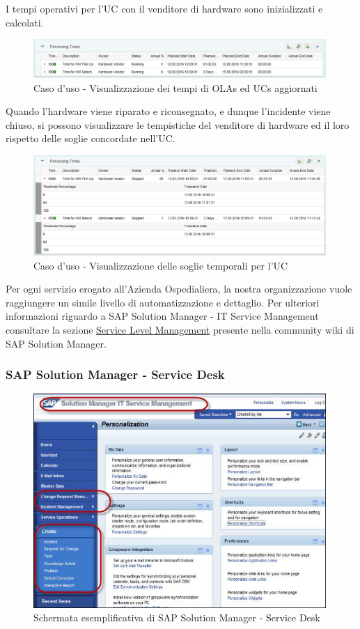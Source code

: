 I tempi operativi per l'UC con il venditore di hardware sono inizializzati e calcolati.

\begin{figure}[H]
\centering
\includegraphics[width=30em]{immagini/sla/sm4.png}
\caption{Caso d'uso - Visualizzazione dei tempi di OLAs ed UCs aggiornati}
\end{figure}

Quando l'hardware viene riparato e riconsegnato, e dunque l'incidente viene chiuso, si possono visualizzare le tempistiche del venditore di hardware ed il loro rispetto delle soglie concordate nell'UC.

\begin{figure}[H]
\centering
\includegraphics[width=30em]{immagini/sla/sm5.png}
\caption{Caso d'uso - Visualizzazione delle soglie temporali per l'UC}
\end{figure}

Per ogni servizio erogato all'Azienda Ospedialiera, la nostra organizzazione vuole raggiungere un simile livello di automatizzazione e dettaglio. Per ulteriori informazioni riguardo a SAP Solution Manager - IT Service Management consultare la sezione \href{https://wiki.scn.sap.com/wiki/display/SAPITSM/Service+Level+Management}{Service Level Management} presente nella community wiki di SAP Solution Manager.

\subsubsection{SAP Solution Manager - Service Desk}

\begin{figure}[H]
\centering
\includegraphics[width=30em]{immagini/sla/servicedesk.png}
\caption{Schermata esemplificativa di SAP Solution Manager - Service Desk}
\end{figure}

